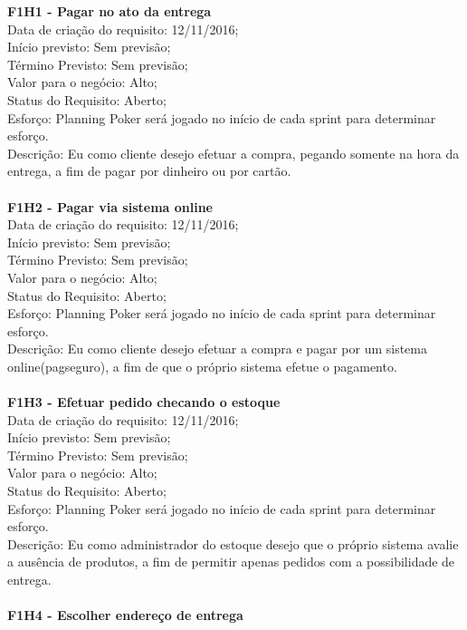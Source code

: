 \begin{apendicesenv}
\textbf{F1H1 - Pagar no ato da entrega }\\
\tab Data de criação do requisito: 12/11/2016;\\
\tab Início previsto: Sem previsão;\\
\tab Término Previsto: Sem previsão;\\
\tab Valor para o negócio: Alto;\\
\tab Status do Requisito: Aberto;\\
\tab Esforço: Planning Poker será jogado no início de cada sprint para determinar esforço.\\
\tab Descrição: Eu como cliente desejo efetuar a compra, pegando somente na hora da entrega, a fim de pagar por dinheiro ou por cartão.\\
\\
\textbf{F1H2 - Pagar via sistema online}\\
\tab Data de criação do requisito: 12/11/2016;\\
\tab Início previsto: Sem previsão;\\
\tab Término Previsto: Sem previsão;\\
\tab Valor para o negócio: Alto;\\
\tab Status do Requisito: Aberto;\\
\tab Esforço: Planning Poker será jogado no início de cada sprint para determinar esforço.\\
\tab Descrição: Eu como cliente desejo efetuar a compra e pagar por um sistema online(pagseguro), a fim de que o próprio sistema efetue o pagamento.\\
\\
\textbf{F1H3 - Efetuar pedido checando o estoque}\\
\tab Data de criação do requisito: 12/11/2016;\\
\tab Início previsto: Sem previsão;\\
\tab Término Previsto: Sem previsão;\\
\tab Valor para o negócio: Alto;\\
\tab Status do Requisito: Aberto;\\
\tab Esforço: Planning Poker será jogado no início de cada sprint para determinar esforço.\\
\tab Descrição: Eu como administrador do estoque desejo que o próprio sistema avalie a ausência de produtos, a fim de permitir apenas pedidos com a possibilidade de entrega.\\
\\
\textbf{F1H4 - Escolher endereço de entrega}\\

\end{apendicesenv}
